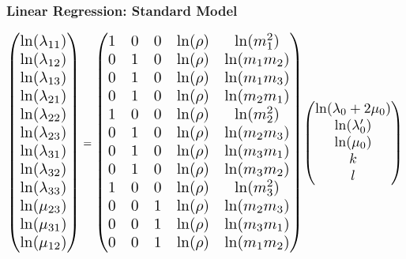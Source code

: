 \documentclass[xcolor=table]{beamer}
\begin{document}
\begin{frame}
	\frametitle{Linear Regression: Standard Model}
	\begin{equation}\resizebox{!}{.3\textwidth}{$
		\begin{pmatrix}
			\ln(\lambda_{11}) \\
			\ln(\lambda_{12}) \\
			\ln(\lambda_{13}) \\
			\ln(\lambda_{21}) \\
			\ln(\lambda_{22}) \\
			\ln(\lambda_{23}) \\
			\ln(\lambda_{31}) \\
			\ln(\lambda_{32}) \\
			\ln(\lambda_{33}) \\
			\ln(\mu_{23}) \\
			\ln(\mu_{31}) \\
			\ln(\mu_{12}) \\
		\end{pmatrix}$}
		=
		\resizebox{!}{.3\textwidth}{$
		\begin{pmatrix}
			1 & 0 & 0 & \ln(\rho) & \ln(m_1^2) \\
			0 & 1 & 0 & \ln(\rho) & \ln(m_1 m_2) \\
			0 & 1 & 0 & \ln(\rho) & \ln(m_1 m_3) \\
			0 & 1 & 0 & \ln(\rho) & \ln(m_2 m_1) \\
			1 & 0 & 0 & \ln(\rho) & \ln(m_2^2) \\
			0 & 1 & 0 & \ln(\rho) & \ln(m_2 m_3) \\
			0 & 1 & 0 & \ln(\rho) & \ln(m_3 m_1) \\
			0 & 1 & 0 & \ln(\rho) & \ln(m_3 m_2) \\
			1 & 0 & 0 & \ln(\rho) & \ln(m_3^2) \\
			0 & 0 & 1 & \ln(\rho) & \ln(m_2 m_3) \\
			0 & 0 & 1 & \ln(\rho) & \ln(m_3 m_1) \\
			0 & 0 & 1 & \ln(\rho) & \ln(m_1 m_2) \\
		\end{pmatrix}$}
		\resizebox{!}{.12\textwidth}{$
		\begin{pmatrix}
			\ln(\lambda_0 + 2\mu_0) \\
			\ln(\lambda_0') \\
			\ln(\mu_0) \\
			k \\
			l \\
		\end{pmatrix}$}

\end{equation}
\end{frame}
\end{document}
